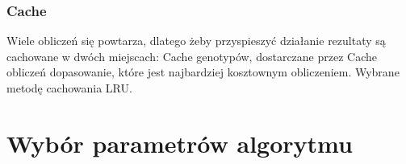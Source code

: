 \subsubsection{Cache}

Wiele obliczeń się powtarza, dlatego żeby przyspieszyć działanie rezultaty są cachowane w dwóch miejscach:
Cache genotypów, dostarczane przez 
Cache obliczeń dopasowanie, które jest najbardziej kosztownym obliczeniem. Wybrane metodę cachowania LRU.  
\section{Wybór parametrów algorytmu}
